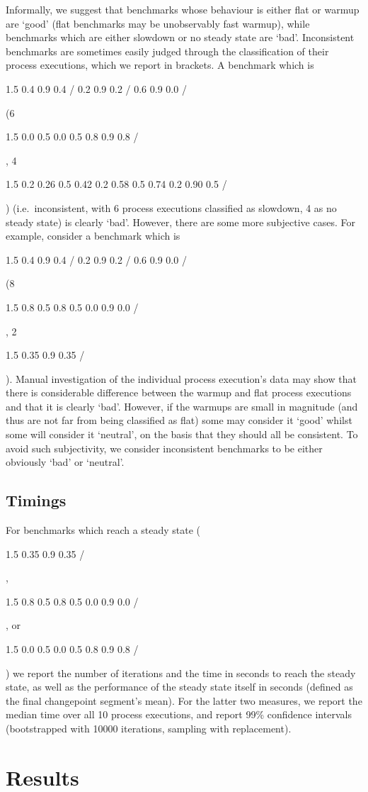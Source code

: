 \documentclass[preprint,numbers,10pt]{sigplanconf}
\DeclareRobustCommand{\flatc}{%
\setlength{\sparklinethickness}{0.4pt}%
\begin{sparkline}{1.5}
\spark 0.1 0.35
       0.9 0.35
       /%
\end{sparkline}\xspace}
\DeclareRobustCommand{\nosteadystate}{%
\setlength{\sparklinethickness}{0.4pt}%
\begin{sparkline}{1.5}
\spark 0.1 0.2
       0.26 0.5
       0.42 0.2
       0.58 0.5
       0.74 0.2
       0.90 0.5
       /%
\end{sparkline}\xspace}
\DeclareRobustCommand{\warmup}{%
\setlength{\sparklinethickness}{0.4pt}%
\begin{sparkline}{1.5}
\spark 0.1 0.8
       0.5 0.8
       0.5 0.0
       0.9 0.0
       /%
\end{sparkline}\xspace}
\DeclareRobustCommand{\slowdown}{%
\setlength{\sparklinethickness}{0.4pt}%
\begin{sparkline}{1.5}
\spark 0.1 0.0
       0.5 0.0
       0.5 0.8
       0.9 0.8
       /%
\end{sparkline}\xspace}
\DeclareRobustCommand{\inconsistent}{%
\setlength{\sparklinethickness}{0.4pt}%
\begin{sparkline}{1.5}
\spark 0.1 0.4
       0.9 0.4
       /%
\spark 0.1 0.2
       0.9 0.2
       /%
\spark 0.1 0.6
       0.9 0.0
       /%
\end{sparkline}\xspace}
\begin{document}
Informally, we suggest that benchmarks whose behaviour is either flat or warmup
are `good' (flat benchmarks may be unobservably fast warmup), while
benchmarks which are either slowdown or no steady state are `bad'.
Inconsistent benchmarks are sometimes easily judged through the classification
of their process executions, which we report in brackets. A
benchmark which is \inconsistent(6\slowdown, 4\nosteadystate) (i.e.~inconsistent,
with 6 process executions classified as slowdown, 4 as no steady state) is clearly `bad'.
However, there are some more subjective cases. For example, consider a benchmark
which is \inconsistent(8\warmup, 2\flatc). Manual investigation of the individual process execution's data
may show that there is considerable difference between the warmup and flat
process executions and that it is clearly `bad'. However, if the
warmups are small in magnitude (and thus are not far from being
classified as flat) some may consider it `good' whilst some will consider it `neutral',
on the basis that they should all be consistent. To avoid such subjectivity,
we consider inconsistent benchmarks to be either obviously `bad' or `neutral'.

\subsection{Timings}

For benchmarks which reach a steady state (\flatc, \warmup, or \slowdown)
we report the number of iterations and the time in seconds to reach the steady state,
as well as the performance of the steady state itself in seconds (defined as
the final changepoint segment's mean). For the latter two measures, we report the median time
over all 10 process executions, and report 99\% confidence intervals (bootstrapped
with 10000 iterations, sampling with replacement).


\section{Results}
\label{sec:results}
\end{document}
